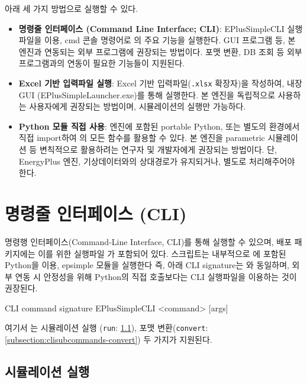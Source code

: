 \simulator\은 아래 세 가지 방법으로 실행할 수 있다.
\begin{itemize}
  \item \textbf{명령줄 인터페이스 (Command Line Interface; CLI)}: EPlusSimpleCLI 실행파일을 이용, cmd 콘솔 명령어로 \simulator 의 주요 기능을 실행한다. GUI 프로그램 등, 본 엔진과 연동되는 외부 프로그램에 권장되는 방법이다. 포맷 변환, DB 조회 등 외부 프로그램과의 연동이 필요한 기능들이 지원된다.
  \item \textbf{Excel 기반 입력파일 실행}: Excel 기반 입력파일(\texttt{.xlsx} 확장자)을 작성하여, 내장 GUI (EPlusSimpleLauncher.exe)를 통해 \simulator \를 실행한다. 본 엔진을 독립적으로 사용하는 사용자에게 권장되는 방법이며, 시뮬레이션의 실행만 가능하다.
  \item \textbf{Python 모듈 직접 사용}: 엔진에 포함된 portable Python, 또는 별도의 환경에서 \pymodule\을 직접 import하여 \simulator 의 모든 함수를 활용할 수 있다. 본 엔진을 parametric 시뮬레이션 등 변칙적으로 활용하려는 연구자 및 개발자에게 권장되는 방법이다. 단, EnergyPlus 엔진, 기상데이터와의 상대경로가 유지되거나, 별도로 처리해주어야 한다.
\end{itemize}


\section{명령줄 인터페이스 (CLI)}
\label{section:howtorun-cli}

\simulator\은 명령행 인터페이스(Command-Line Interface, CLI)를 통해 실행할 수 있으며, 배포 패키지에는 이를 위한 실행파일 가 포함되어 있다. 스크립트는 내부적으로 \simulator 에 포함된 Python을 이용, epsimple 모듈을 실행한다 즉, 아래 CLI signature는 와 동일하며, 외부 연동 시 안정성을 위해 Python의 직접 호출보다는 CLI 실행파일을 이용하는 것이 권장된다.

\begin{codeblock}{CLI command signature}
EPlusSimpleCLI <command> [args]
\end{codeblock}

여기서 는 시뮬레이션 실행 (\texttt{run}: \ref{subsection:clisubcommands-run}), 포맷 변환(\texttt{convert}: \ref{subsection:clisubcommands-convert}) 두 가지가 지원된다.

\subsection{시뮬레이션 실행}
\label{subsection:clisubcommands-run}


